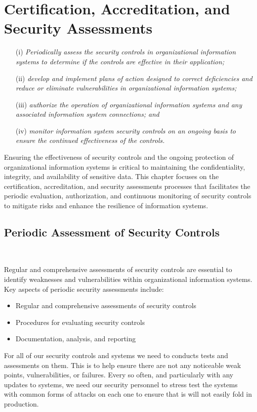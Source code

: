 \documentclass[12pt,a4paper]{report}
\begin{document}
\chapter{Certification, Accreditation, and Security Assessments}
\begin{enumerate}
 \item[(i)]	\textit{Periodically assess the security controls in organizational information systems to determine if the controls are effective in their application;}
 \item[(ii)] \textit{develop and implement plans of action designed to correct deficiencies and reduce or eliminate vulnerabilities in organizational information systems;}
 \item[(iii)] \textit{authorize the operation of organizational information systems and any associated information system connections; and}
 \item[(iv)] \textit{monitor information system security controls on an ongoing basis to ensure the continued effectiveness of the controls.}
\end{enumerate}

Ensuring the effectiveness of security controls and the ongoing protection of organizational information systems is critical to maintaining the confidentiality, integrity, and availability of sensitive data. 
This chapter focuses on the certification, accreditation, and security assessments processes that facilitates the periodic evaluation, authorization, and continuous monitoring of security controls to mitigate risks and enhance the resilience of information systems.

\section{Periodic Assessment of Security Controls}
\

Regular and comprehensive assessments of security controls are essential to identify weaknesses and vulnerabilities within organizational information systems. 
Key aspects of periodic security assessments include:
\begin{itemize}
 \item Regular and comprehensive assessments of security controls 
 \item Procedures for evaluating security controls
 \item Documentation, analysis, and reporting
\end{itemize}

For all of our security controls and systems we need to conducts tests and assessments on them.
This is to help ensure there are not any noticeable weak points, vulnerabilities, or failures.
Every so often, and particularly with any updates to systems, we need our security personnel to stress test the systems with common forms of attacks on each one to ensure that is will not easily fold in production.
\end{document}
